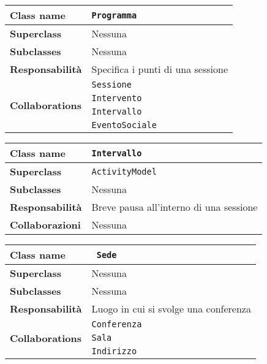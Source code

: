 \begin{table}[h!]
	\begin{tabular}{|l|l|}
		\hline
		\textbf{Class name} & \texttt{Programma} \\ \hline
		\textbf{Superclass} & Nessuna \\ \hline
		\textbf{Subclasses} & Nessuna  \\ \hline
		\textbf{Responsabilità} & Specifica i punti di una sessione \\ \hline
		\multirow{4}{*}{\textbf{Collaborations}} & \texttt{Sessione} \\ 
		& \texttt{Intervento }\\
		& \texttt{Intervallo} \\
		& \texttt{EventoSociale} \\ \hline
	\end{tabular}
\end{table}
\begin{table}[h!]
	\begin{tabular}{|l|l|}
		\hline
		\textbf{Class name} & \texttt{Intervallo} \\ \hline
		\textbf{Superclass} & \texttt{ActivityModel} \\ \hline
		\textbf{Subclasses} & Nessuna  \\ \hline
		\textbf{Responsabilità} & Breve pausa all'interno di una sessione \\ \hline
		\textbf{Collaborazioni} & Nessuna \\ \hline
	\end{tabular}
\end{table}
\begin{table}[h!]
	\begin{tabular}{|l|l|}
		\hline
		\textbf{Class name} &\texttt{ Sede} \\ \hline
		\textbf{Superclass} & Nessuna \\ \hline
		\textbf{Subclasses} & Nessuna  \\ \hline
		\textbf{Responsabilità} & Luogo in cui si svolge una conferenza\\ \hline
		\multirow{3}{*}{\textbf{Collaborations}} & \texttt{Conferenza} \\ 
		& \texttt{Sala} \\ 
		& \texttt{Indirizzo} \\ \hline
\end{tabular}
\end{table}

